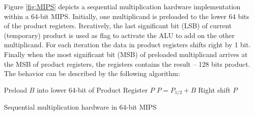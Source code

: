 \begin{Example}

\begin{figure}[H]
\end{figure}

Figure \ref{fig:MIPS} depicts a sequential multiplication hardware implementation within a 64-bit 
MIPS. Initially, one multiplicand is preloaded to the lower 64 bits of the product registers. 
Iteratively, the last significant bit (LSB) of current (temporary) product is used as flag to activate the ALU 
to add on the other multiplicand. For each iteration the data in product registers shifts right by 1 bit.
Finally when the most significant bit (MSB) of preloaded multiplicand arrives at the MSB of product registers,
the registers contains the result -- 128 bits product. The behavior can be described by the following algorithm:


\IncMargin{1em}
\begin{algorithm}[H]
\SetAlgoNoLine
\Indm
\Indp

  Preload $B$ into lower 64-bit of Product Register $P$\;
  {
  	{
		$P = P_{1/2}+B$\;
	}
	Right shift $P$\;
  }
\caption {Sequential multiplication hardware in 64-bit MIPS}\label{alg:MIPS}
\end{algorithm}
\DecMargin{1em}


\end{Example}
